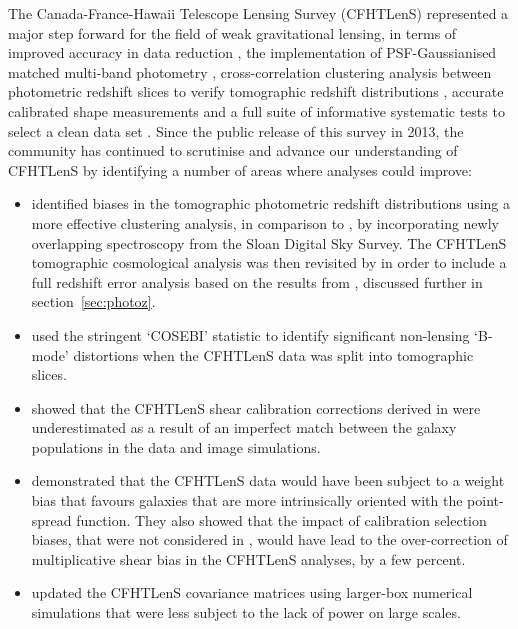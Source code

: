 The Canada-France-Hawaii Telescope Lensing Survey (CFHTLenS) represented a major step forward for the field of weak gravitational lensing, in terms of improved accuracy in data reduction \citep{erben/etal:2013}, the implementation of PSF-Gaussianised matched multi-band photometry \citep{hildebrandt/etal:2012}, cross-correlation clustering analysis between photometric redshift slices to verify tomographic redshift distributions \citep{benjamin/etal:2013}, accurate calibrated shape measurements \citep{miller/etal:2013} and a full suite of informative systematic tests to select a clean data set \citep{heymans/etal:2012}.    Since the public release of this survey in 2013, the community has continued to scrutinise and advance our understanding of CFHTLenS by identifying a number of areas where analyses could improve:
\begin{itemize}
\item{\citet{choi/etal:2016} identified biases in the tomographic photometric redshift distributions using a more effective clustering analysis, in comparison to \citet{benjamin/etal:2013}, by incorporating newly overlapping spectroscopy from the Sloan Digital Sky Survey.  The CFHTLenS tomographic cosmological analysis was then revisited by \citet{joudaki/etal:2016} in order to include a full redshift error analysis based on the results from \citet{choi/etal:2016}, discussed further in section~\ref{sec:photoz}.}
\item{\citet{asgari/etal:2016} used the stringent `COSEBI' statistic to identify significant non-lensing `B-mode' distortions when the CFHTLenS data was split into tomographic slices.}
\item{\citet{kuijken/etal:2015} showed that the CFHTLenS shear calibration corrections derived in \citet{miller/etal:2013} were underestimated as a result of an imperfect match between the galaxy populations in the data and image simulations.}
\item{\citet{fenechconti/etal:2016} demonstrated that the CFHTLenS data would have been subject to a weight bias that favours galaxies that are more intrinsically oriented with the point-spread function.  They also showed that the impact of calibration selection biases, that were not considered in \citet{miller/etal:2013}, would have lead to the over-correction of multiplicative shear bias in the CFHTLenS analyses, by a few percent.}
\item{\citet{joudaki/etal:2016} updated the CFHTLenS covariance matrices using larger-box numerical simulations that were less subject to the lack of power on large scales.}
\end{itemize}
